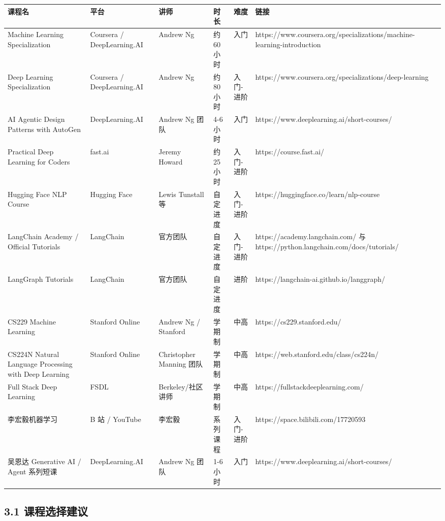 \begingroup
\scriptsize
\setlength{\tabcolsep}{3pt}
\begin{longtable}{|p{}|p{}|p{}|p{}|p{}|p{}|}
\hline
课程名 & 平台 & 讲师 & 时长 & 难度 & 链接 \\ \hline
Machine Learning Specialization & Coursera / DeepLearning.AI & Andrew Ng & 约 60 小时 & 入门 & https://www.coursera.org/specializations/machine-learning-introduction \\ \hline
Deep Learning Specialization & Coursera / DeepLearning.AI & Andrew Ng & 约 80 小时 & 入门-进阶 & https://www.coursera.org/specializations/deep-learning \\ \hline
AI Agentic Design Patterns with AutoGen & DeepLearning.AI & Andrew Ng 团队 & 4-6 小时 & 入门 & https://www.deeplearning.ai/short-courses/ \\ \hline
Practical Deep Learning for Coders & fast.ai & Jeremy Howard & 约 25 小时 & 入门-进阶 & https://course.fast.ai/ \\ \hline
Hugging Face NLP Course & Hugging Face & Lewis Tunstall 等 & 自定进度 & 入门-进阶 & https://huggingface.co/learn/nlp-course \\ \hline
LangChain Academy / Official Tutorials & LangChain & 官方团队 & 自定进度 & 入门-进阶 & https://academy.langchain.com/ 与 https://python.langchain.com/docs/tutorials/ \\ \hline
LangGraph Tutorials & LangChain & 官方团队 & 自定进度 & 进阶 & https://langchain-ai.github.io/langgraph/ \\ \hline
CS229 Machine Learning & Stanford Online & Andrew Ng / Stanford & 学期制 & 中高 & https://cs229.stanford.edu/ \\ \hline
CS224N Natural Language Processing with Deep Learning & Stanford Online & Christopher Manning 团队 & 学期制 & 中高 & https://web.stanford.edu/class/cs224n/ \\ \hline
Full Stack Deep Learning & FSDL & Berkeley/社区讲师 & 学期制 & 中高 & https://fullstackdeeplearning.com/ \\ \hline
李宏毅机器学习 & B 站 / YouTube & 李宏毅 & 系列课程 & 入门-进阶 & https://space.bilibili.com/17720593 \\ \hline
吴恩达 Generative AI / Agent 系列短课 & DeepLearning.AI & Andrew Ng 团队 & 1-6 小时 & 入门 & https://www.deeplearning.ai/short-courses/ \\ \hline
\end{longtable}
\endgroup

\subsection{3.1 课程选择建议}

